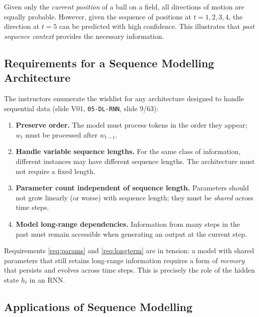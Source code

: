 \documentclass[12pt,a4paper]{article}
\begin{document}
\begin{example}[title={Ball Trajectory Prediction}]
Given only the \emph{current position} of a ball on a field, all directions
of motion are equally probable.  However, given the sequence of positions
at $t{=}1,2,3,4$, the direction at $t{=}5$ can be predicted with high
confidence.  This illustrates that \emph{past sequence context} provides
the necessary information.
\end{example}

\subsection{Requirements for a Sequence Modelling Architecture}
\label{subsec:requirements}

The instructors enumerate the wishlist for any architecture designed to
handle sequential data (slide V01, \texttt{05-DL-RNN}, slide 9/63):

\begin{enumerate}[label=\textbf{R\arabic*.}, leftmargin=3em]
  \item \label{req:order} \textbf{Preserve order.} The model must process
        tokens in the order they appear; $w_t$ must be processed after
        $w_{t-1}$.
  \item \label{req:varlen} \textbf{Handle variable sequence lengths.} For the
        same class of information, different instances may have different
        sequence lengths.  The architecture must not require a fixed length.
  \item \label{req:params} \textbf{Parameter count independent of sequence
        length.} Parameters should not grow linearly (or worse) with
        sequence length; they must be \emph{shared} across time steps.
  \item \label{req:longterm} \textbf{Model long-range dependencies.}
        Information from many steps in the past must remain accessible when
        generating an output at the current step.
\end{enumerate}

\begin{keyinsight}
Requirements \ref{req:params} and \ref{req:longterm} are in tension: a model
with shared parameters that still retains long-range information requires a
form of \emph{memory} that persists and evolves across time steps.  This is
precisely the role of the hidden state $h_t$ in an RNN.
\end{keyinsight}

\subsection{Applications of Sequence Modelling}
\label{subsec:applications}
\end{document}

